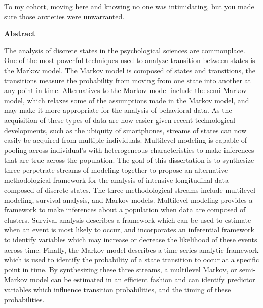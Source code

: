 \documentclass[12pt]{./styles/outhesis}
\begin{document}
To my cohort, moving here and knowing no one was intimidating, but you made sure those anxieties were unwarranted. 


{}\setcounter{page}{6}
\tableofcontents
{}\setcounter{page}{7}
\listoftables
{}\setcounter{page}{8}
\listoffigures
\newpage
\setcounter{page}{9}

\begin{center}
{\large \bf Abstract}
\end{center}

The analysis of discrete states in the psychological sciences are commonplace. One of the most powerful techniques used to analyze transition between states is the Markov model. The Markov model is composed of states and transitions, the transitions measure the probability from moving from one state into another at any point in time. Alternatives to the Markov model include the semi-Markov model, which relaxes some of the assumptions made in the Markov model, and may make it more appropriate for the analysis of behavioral data. As the acquisition of these types of data are now easier given recent technological developments, such as the ubiquity of smartphones, streams of states can now easily be acquired from multiple individuals. Multilevel modeling is capable of pooling across individual's with heterogeneous characteristics to make inferences that are true across the population. The goal of this dissertation is to synthesize three perpetrate streams of modeling together to propose an alternative methodological framework for the analysis of intensive longitudinal data composed of discrete states. The three methodological streams include multilevel modeling, survival analysis, and Markov models. Multilevel modeling provides a framework to make inferences about a population when data are composed of clusters. Survival analysis describes a framework which can be used to estimate when an event is most likely to occur, and incorporates an inferential framework to identify variables which may increase or decrease the likelihood of these events across time. Finally, the Markov model describes a time series analytic framework which is used to identify the probability of a state transition to occur at a specific point in time. By synthesizing these three streams, a multilevel Markov, or semi-Markov model can be estimated in an efficient fashion and can identify predictor variables which influence transition probabilities, and the timing of these probabilities.
\end{document}
